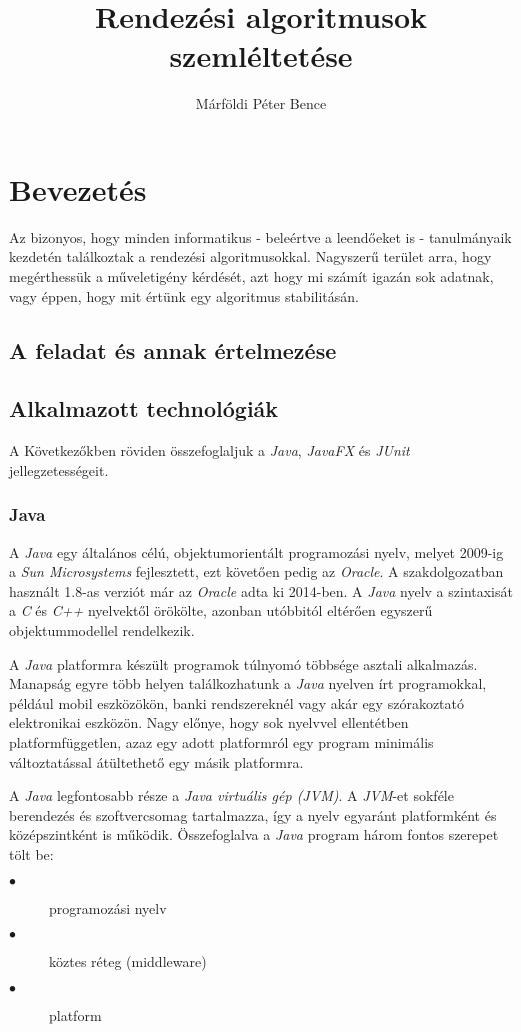\documentclass{elteikthesis}
\title{Rendezési algoritmusok szemléltetése}
\author{Márföldi Péter Bence}
\begin{document}
\frontmatter

	\maketitle
	\renewcommand{\thepage}{\Roman{page}}
	\tableofcontents\thispagestyle{fancy}
	
\mainmatter
	\pagestyle{fancy}

\chapter{Bevezetés} 
Az bizonyos, hogy minden informatikus - beleértve a leendőeket is - tanulmányaik kezdetén találkoztak a rendezési algoritmusokkal. Nagyszerű terület arra, hogy megérthessük a műveletigény kérdését, azt hogy mi számít igazán sok adatnak, vagy éppen, hogy mit értünk egy algoritmus stabilitásán.

\section{A feladat és annak értelmezése} 

\section{Alkalmazott technológiák}
A Következőkben röviden összefoglaljuk a \emph{Java}\cite{Java}, \emph{JavaFX}\cite{JavaFX} és \emph{JUnit}\cite{JUnit} jellegzetességeit.
\subsection{Java}
A \emph{Java} egy általános célú, objektumorientált programozási nyelv, melyet 2009-ig a \emph{Sun Microsystems} fejlesztett, ezt követően pedig az \emph{Oracle}. A szakdolgozatban használt 1.8-as verziót már az \emph{Oracle} adta ki 2014-ben. A \emph{Java} nyelv a szintaxisát a \emph{C} és \emph{C++} nyelvektől örökölte, azonban utóbbitól eltérően egyszerű objektummodellel rendelkezik. \par
 A \emph{Java} platformra készült programok túlnyomó többsége asztali alkalmazás. Manapság egyre több helyen találkozhatunk a \emph{Java} nyelven írt programokkal, például mobil eszközökön, banki rendszereknél vagy akár egy szórakoztató elektronikai eszközön. Nagy előnye, hogy sok nyelvvel ellentétben platformfüggetlen, azaz egy adott platformról egy program minimális változtatással átültethető egy másik platformra. \par
 A \emph{Java} legfontosabb része a \emph{Java virtuális gép (JVM)}. A \emph{JVM}-et sokféle berendezés és szoftvercsomag tartalmazza, így a nyelv egyaránt platformként és középszintként is működik.
Összefoglalva a \emph{Java} program három fontos szerepet tölt be:
\begin{description}
\item[$\bullet$] programozási nyelv
\item[$\bullet$] köztes réteg (middleware)
\item[$\bullet$] platform
\end{description}
\end{document}
